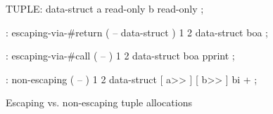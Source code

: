 \centering

  \begin{factorcode}
    TUPLE: data-struct
        { a read-only }
        { b read-only } ;

    : escaping-via-#return ( -- data-struct )
        1 2 data-struct boa ;

    : escaping-via-#call ( -- )
        1 2 data-struct boa pprint ;

    : non-escaping ( -- )
        1 2 data-struct [ a>> ] [ b>> ] bi + ;
  \end{factorcode}

\caption{Escaping vs. non-escaping tuple allocations}
